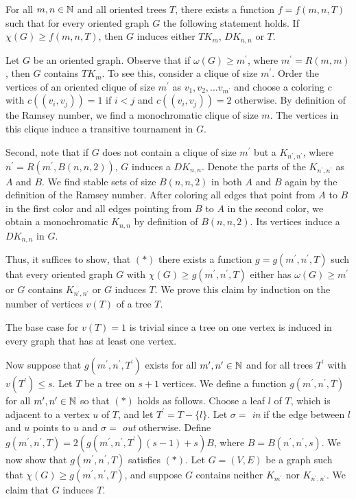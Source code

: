 \begin{thm}\label{t2cr}
For all $m,n\in\mathbb{N}$ and all oriented trees $T$, there exists a function $f=f(m,n,T)$ such that for every oriented graph $G$ the following statement holds. If $\chi (G)\geq f(m,n,T)$, then $G$ induces either $TK_m$, $DK_{n,n}$ or $T$.
\end{thm}

\begin{prf}
Let $G$ be an oriented graph. Observe that if $\omega (G)\geq m^\prime$, where $m^\prime = R(m,m)$, then $G$ contains $TK_m$. To see this, consider a clique of size $m^\prime$. Order the vertices of an oriented clique of size $m^\prime$ as $v_1,v_2,\dots v_{m^\prime}$ and choose a coloring $c$ with $c((v_i,v_j))=1$ if $i<j$ and $c((v_i, v_j))=2$ otherwise. By definition of the Ramsey number, we find a monochromatic clique of size $m$. The vertices in this clique induce a transitive tournament in $G$.

Second, note that if $G$ does not contain a clique of size $m^\prime$ but a $K_{n^\prime , n^\prime}$, where $n^\prime = R(m^\prime , B(n,n,2))$, $G$ induces a $DK_{n,n}$. Denote the parts of the $K_{n^\prime , n^\prime}$ as $A$ and $B$. We find stable sets of size $B(n,n,2)$ in both $A$ and $B$ again by the definition of the Ramsey number. After coloring all edges that point from $A$ to $B$ in the first color and all edges pointing from $B$ to $A$ in the second color, we obtain a monochromatic $K_{n,n}$ by definition of $B(n,n,2)$. Its vertices induce a $DK_{n,n}$ in $G$. 

Thus, it suffices to show, that $(\ast)$ there exists a function $g=g(m^\prime ,n^\prime ,T)$ such that every oriented graph $G$ with $\chi (G)\geq g(m^\prime ,n^\prime ,T)$ either has $\omega (G)\geq m^\prime$ or $G$ contains $K_{n^\prime ,n^\prime }$ or $G$ induces $T$. We prove this claim by induction on the number of vertices $v(T)$ of a tree $T$. 

The base case for $v(T)=1$ is trivial since a tree on one vertex is induced in every graph that has at least one vertex. 

Now suppose that $g(m^\prime ,n^\prime ,T^\prime )$ exists for all $m^\prime ,n^\prime \in\mathbb{N}$ and for all trees $T^\prime$ with $v(T^\prime )\leq s$. Let $T$ be a tree on $s+1$ vertices. We define a function $g(m^\prime ,n^\prime ,T)$ for all $m^\prime ,n^\prime\in\mathbb{N}$ so that $(\ast)$ holds as follows. Choose a leaf $l$ of $T$, which is adjacent to a vertex $u$ of $T$, and let $T^\prime = T- \{l\}$. Let $\sigma =$ \textit{in} if the edge between $l$ and $u$ points to $u$ and $\sigma = $ \textit{out} otherwise. Define $g(m^\prime ,n^\prime ,T) = 2(g(m^\prime ,n^\prime ,T^\prime )(s-1)+s)B$, where $B=B(n^\prime ,n^\prime ,s)$. We now show that $g(m^\prime ,n^\prime ,T)$ satisfies $(\ast)$. Let $G=(V,E)$ be a graph such that $\chi (G)\geq g(m^\prime ,n^\prime ,T)$, and suppose $G$ contains neither $K_{m^\prime}$ nor $K_{n^\prime ,n^\prime}$. We claim that $G$ induces $T$.


\end{prf}
